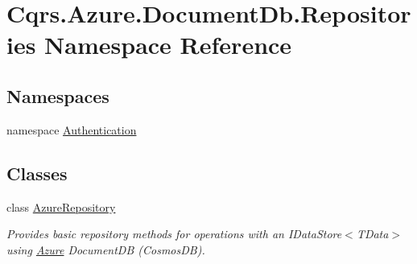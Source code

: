 \hypertarget{namespaceCqrs_1_1Azure_1_1DocumentDb_1_1Repositories}{}\section{Cqrs.\+Azure.\+Document\+Db.\+Repositories Namespace Reference}
\label{namespaceCqrs_1_1Azure_1_1DocumentDb_1_1Repositories}
\subsection*{Namespaces}
\begin{DoxyCompactItemize}
\item 
namespace \hyperlink{namespaceCqrs_1_1Azure_1_1DocumentDb_1_1Repositories_1_1Authentication}{Authentication}
\end{DoxyCompactItemize}
\subsection*{Classes}
\begin{DoxyCompactItemize}
\item 
class \hyperlink{classCqrs_1_1Azure_1_1DocumentDb_1_1Repositories_1_1AzureRepository}{Azure\+Repository}
\begin{DoxyCompactList}\small\item\em Provides basic repository methods for operations with an I\+Data\+Store$<$\+T\+Data$>$ using \hyperlink{namespaceCqrs_1_1Azure}{Azure} Document\+DB (Cosmos\+DB). \end{DoxyCompactList}\end{DoxyCompactItemize}
